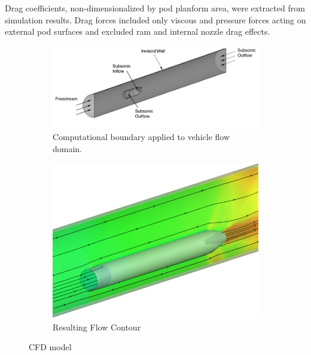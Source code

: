 	Drag coefficients, non-dimensionalized by pod planform area,
	were extracted from simulation results.
	Drag forces included only viscous and pressure forces acting on external
	pod surfaces and excluded ram and internal nozzle drag effects.

	\begin{figure}
		\centering
		\begin{subfigure}[t]{.5\textwidth}
		  \centering
		  \includegraphics{../../images/CFDmodel.png}
		  \caption{Computational boundary applied to vehicle flow domain.}
		  \label{fig:CFDmodel}
		\end{subfigure}%
		\begin{subfigure}[t]{.5\textwidth}
		  \centering
		  \includegraphics[width=.75\textwidth]{../../images/hyperloopIsoView.png}
		  \caption{Resulting Flow Contour}
		\label{fig:CFDresults}
		\end{subfigure}
		\caption{CFD model}
		\label{fig:CFD}
	\end{figure}


